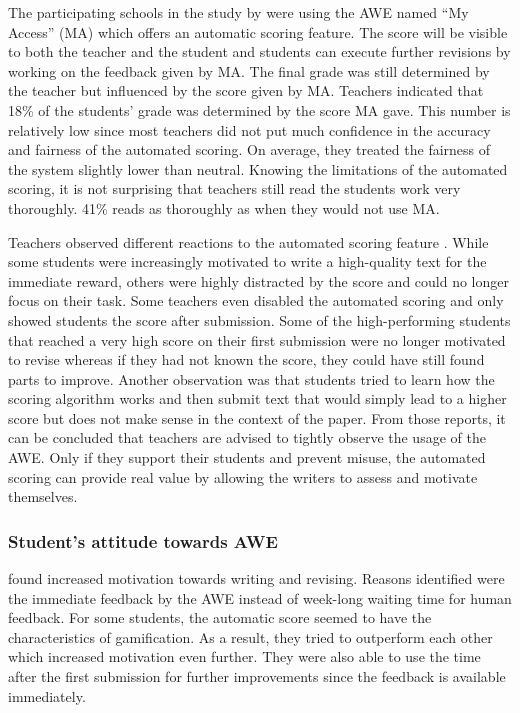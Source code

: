 \documentclass[runningheads]{llncs}
\begin{document}
The participating schools in the study by \textcite{grimes_utility_2010} were using the AWE named ``My Access'' (MA) which offers an automatic scoring feature. The score will be visible to both the teacher and the student and students can execute further revisions by working on the feedback given by MA. The final grade was still determined by the teacher but influenced by the score given by MA. Teachers indicated that 18\% of the students' grade was determined by the score MA gave. This number is relatively low since most teachers did not put much confidence in the accuracy and fairness of the automated scoring. On average, they treated the fairness of the system slightly lower than neutral. Knowing the limitations of the automated scoring, it is not surprising that teachers still read the students work very thoroughly. 41\% reads as thoroughly as when they would not use MA. 

Teachers observed different reactions to the automated scoring feature \citep{grimes_utility_2010}. While some students were increasingly motivated to write a high-quality text for the immediate reward, others were highly distracted by the score and could no longer focus on their task. Some teachers even disabled the automated scoring and only showed students the score after submission. Some of the high-performing students that reached a very high score on their first submission were no longer motivated to revise whereas if they had not known the score, they could have still found parts to improve. Another observation was that students tried to learn how the scoring algorithm works and then submit text that would simply lead to a higher score but does not make sense in the context of the paper. From those reports, it can be concluded that teachers are advised to tightly observe the usage of the AWE. Only if they support their students and prevent misuse, the automated scoring can provide real value by allowing the writers to assess and motivate themselves.

\subsubsection{Student's attitude towards AWE}
\textcite{grimes_utility_2010} found increased motivation towards writing and revising. Reasons identified were the immediate feedback by the AWE instead of week-long waiting time for human feedback. For some students, the automatic score seemed to have the characteristics of gamification. As a result, they tried to outperform each other which increased motivation even further. They were also able to use the time after the first submission for further improvements since the feedback is available immediately.
\end{document}
